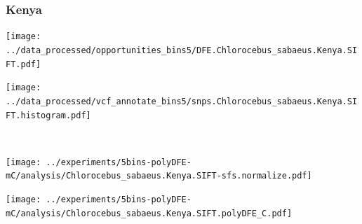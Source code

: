 \subsubsection{Kenya}

\begin{minipage}{0.49\linewidth}
    \texttt{[image: ../data\_processed/opportunities\_bins5/DFE.Chlorocebus\_sabaeus.Kenya.SIFT.pdf]}
\end{minipage}
\begin{minipage}{0.49\linewidth}
    \texttt{[image: ../data\_processed/vcf\_annotate\_bins5/snps.Chlorocebus\_sabaeus.Kenya.SIFT.histogram.pdf]}
\end{minipage}
\\
\begin{minipage}{0.49\linewidth}
    \texttt{[image: ../experiments/5bins-polyDFE-mC/analysis/Chlorocebus\_sabaeus.Kenya.SIFT-sfs.normalize.pdf]}
\end{minipage}
\begin{minipage}{0.4\linewidth}
    \texttt{[image: ../experiments/5bins-polyDFE-mC/analysis/Chlorocebus\_sabaeus.Kenya.SIFT.polyDFE\_C.pdf]}
\end{minipage}
